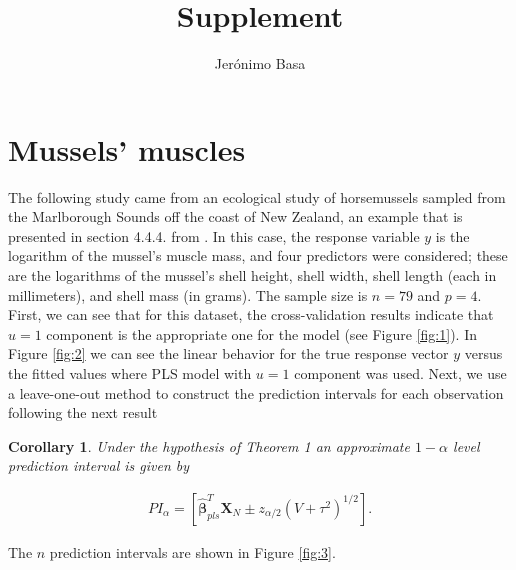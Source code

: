 \documentclass{article}
\title{Supplement}
\author{Jerónimo Basa}
\date{ }
\newtheorem{cor}{Corollary}
\theoremstyle{definition}
\newcommand{\X}{\boldsymbol{X}}
\newcommand{\wbb}{\widehat{\boldsymbol{\beta}}}
\begin{document}
\section{Mussels' muscles}
The following study came from an ecological study of horsemussels sampled from the Marlborough Sounds off the coast of New Zealand, an example that is presented in section 4.4.4. from \cite{c}. In this case, the response variable $y$ is the logarithm of the mussel's muscle mass, and four predictors were considered; these are the logarithms of the mussel’s shell height, shell width, shell length (each in millimeters), and shell mass (in grams). The sample size is $n=79$ and $p=4$. First, we can see that for this dataset, the cross-validation results indicate that $u=1$ component is the appropriate one for the model  (see Figure \ref{fig:1}). In Figure \ref{fig:2} we can see the linear behavior for the true response vector $y$ versus the fitted values where PLS model with $u=1$ component was used.
Next, we use a leave-one-out method to construct the prediction intervals for each observation following the next result
\begin{cor}
	Under the hypothesis of Theorem 1 an approximate $1-\alpha$ level prediction interval is given by
	\begin{linenomath*}
		\begin{align*}
			PI_{\alpha} = \left[\wbb_{pls}^T \X_N \pm z_{\alpha/2}\left(V+ \tau^2 \right)^{1/2} \right].
		\end{align*}
	\end{linenomath*}
\end{cor}
The $n$ prediction intervals are shown in Figure \ref{fig:3}. 
\end{document}
